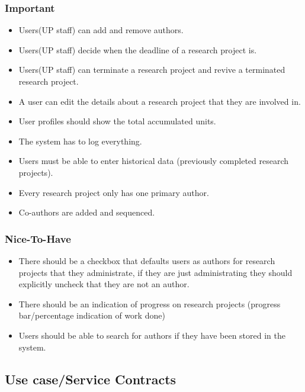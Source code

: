 \documentclass[a4paper,12pt]{report}
\begin{document}
\subsubsection{Important}
	\begin{itemize}
		\item Users(UP staff) can add and remove authors.
		\item Users(UP staff) decide when the deadline of a research project is.
		\item Users(UP staff) can terminate a research project and revive a terminated research project.
		\item A user can edit the details about a research project that they are involved in.
		\item User profiles should show the total accumulated units.
		\item The system has to log everything.
		\item Users must be able to enter historical data (previously completed research projects).
		\item Every research project only has one primary author.
		\item Co-authors are added and sequenced.
	\end{itemize}

\subsubsection{Nice-To-Have}
	\begin{itemize}
		\item There should be a checkbox that defaults users as authors for research projects that they administrate, if they are just administrating they should explicitly uncheck that they are not an author.
		\item There should be an indication of progress on research projects (progress bar/percentage indication of work done)
		\item Users should be able to search for authors if they have been stored in the system.
	\end{itemize}

\subsection{Use case/Service Contracts}
\end{document}
